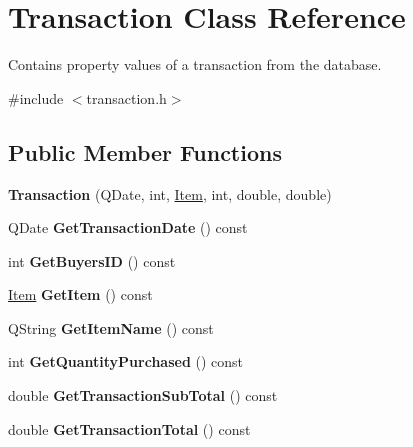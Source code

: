 \hypertarget{class_transaction}{}\section{Transaction Class Reference}
\label{class_transaction}


Contains property values of a transaction from the database.  




{\ttfamily \#include $<$transaction.\+h$>$}

\subsection*{Public Member Functions}
\begin{DoxyCompactItemize}
\item 
\mbox{\label{class_transaction_a048501cb39df72cdd81d4eba73a9ef6b}} 
{\bfseries Transaction} (Q\+Date, int, \mbox{\hyperlink{class_item}{Item}}, int, double, double)
\item 
\mbox{\label{class_transaction_a4460ca592783e1cb0f67dd0b974cb2ba}} 
Q\+Date {\bfseries Get\+Transaction\+Date} () const
\item 
\mbox{\label{class_transaction_a58d5c852fc5ca0599df9298d23996bde}} 
int {\bfseries Get\+Buyers\+ID} () const
\item 
\mbox{\label{class_transaction_a8af32e7e0db74a1990d7a887e658c618}} 
\mbox{\hyperlink{class_item}{Item}} {\bfseries Get\+Item} () const
\item 
\mbox{\label{class_transaction_a30315f86291a072ab4baebb0102fa5a2}} 
Q\+String {\bfseries Get\+Item\+Name} () const
\item 
\mbox{\label{class_transaction_a3edb74863df1a30670611c0d8b50a0fb}} 
int {\bfseries Get\+Quantity\+Purchased} () const
\item 
\mbox{\label{class_transaction_a3c032f59757de41179b1dc2d4b895529}} 
double {\bfseries Get\+Transaction\+Sub\+Total} () const
\item 
\mbox{\label{class_transaction_a15ce6b0ce8a8f155eb4490761e1cb670}} 
double {\bfseries Get\+Transaction\+Total} () const
\end{DoxyCompactItemize}
